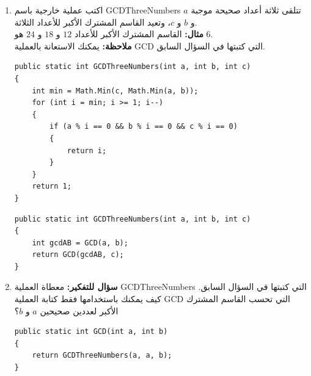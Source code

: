 \documentclass[14pt]{extarticle}
\begin{document}
\begin{enumerate}[resume, itemsep=2em]
\item اكتب عملية خارجية باسم \textenglish{GCDThreeNumbers} تتلقى ثلاثة أعداد صحيحة موجبة $a$ و $b$ و $c$، وتعيد القاسم المشترك الأكبر للأعداد الثلاثة. \\
\textbf{مثال:} القاسم المشترك الأكبر للأعداد $12$ و $18$ و $24$ هو $6$. \\
\textbf{ملاحظة:} يمكنك الاستعانة بالعملية \textenglish{GCD} التي كتبتها في السؤال السابق.
\ifwithsols
\begin{boxSolution}[1]
\begin{english}
\begin{verbatim}
public static int GCDThreeNumbers(int a, int b, int c)
{
    int min = Math.Min(c, Math.Min(a, b));
    for (int i = min; i >= 1; i--)
    {
        if (a % i == 0 && b % i == 0 && c % i == 0)
        {
            return i;
        }
    }
    return 1;
}
\end{verbatim}
\end{english}
\end{boxSolution}

\filbreak

\begin{boxSolution}[2]
\begin{english}
\begin{verbatim}
public static int GCDThreeNumbers(int a, int b, int c)
{
    int gcdAB = GCD(a, b);
    return GCD(gcdAB, c);
}
\end{verbatim}
\end{english}
\end{boxSolution}
\fi
\filbreak

\item \textbf{سؤال للتفكير:} معطاة العملية \textenglish{GCDThreeNumbers} التي كتبتها في السؤال السابق. كيف يمكنك باستخدامها فقط كتابة العملية \textenglish{GCD} التي تحسب القاسم المشترك الأكبر لعددين صحيحين $a$ و $b$؟
\ifwithsols
\begin{boxSolution}
\begin{english}
\begin{verbatim}
public static int GCD(int a, int b)
{
    return GCDThreeNumbers(a, a, b);
}
\end{verbatim}
\end{english}
\end{boxSolution}
\fi
\filbreak


\end{enumerate}
\end{document}
